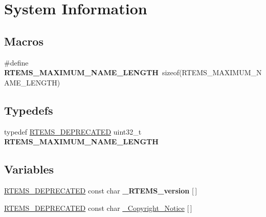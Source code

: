 \hypertarget{group__RTEMSScoreSystem}{}\section{System Information}
\label{group__RTEMSScoreSystem}
\subsection*{Macros}
\begin{DoxyCompactItemize}
\item 
\mbox{\label{group__RTEMSScoreSystem_ga4fbecf4ef5f02c9c17f7a0688cec14a9}} 
\#define {\bfseries R\+T\+E\+M\+S\+\_\+\+M\+A\+X\+I\+M\+U\+M\+\_\+\+N\+A\+M\+E\+\_\+\+L\+E\+N\+G\+TH}~sizeof(R\+T\+E\+M\+S\+\_\+\+M\+A\+X\+I\+M\+U\+M\+\_\+\+N\+A\+M\+E\+\_\+\+L\+E\+N\+G\+TH)
\end{DoxyCompactItemize}
\subsection*{Typedefs}
\begin{DoxyCompactItemize}
\item 
\mbox{\label{group__RTEMSScoreSystem_ga2ab4bed0e2e514060caaebdae35b8288}} 
typedef \mbox{\hyperlink{group__RTEMSScoreBaseDefs_gab651a076d4d51d50221e7ef7ac99d4e7}{R\+T\+E\+M\+S\+\_\+\+D\+E\+P\+R\+E\+C\+A\+T\+ED}} uint32\+\_\+t {\bfseries R\+T\+E\+M\+S\+\_\+\+M\+A\+X\+I\+M\+U\+M\+\_\+\+N\+A\+M\+E\+\_\+\+L\+E\+N\+G\+TH}
\end{DoxyCompactItemize}
\subsection*{Variables}
\begin{DoxyCompactItemize}
\item 
\mbox{\label{group__RTEMSScoreSystem_gaefe4671266ec7c97dcb0cd6924407fe0}} 
\mbox{\hyperlink{group__RTEMSScoreBaseDefs_gab651a076d4d51d50221e7ef7ac99d4e7}{R\+T\+E\+M\+S\+\_\+\+D\+E\+P\+R\+E\+C\+A\+T\+ED}} const char {\bfseries \+\_\+\+R\+T\+E\+M\+S\+\_\+version} \mbox{[}$\,$\mbox{]}
\item 
\mbox{\hyperlink{group__RTEMSScoreBaseDefs_gab651a076d4d51d50221e7ef7ac99d4e7}{R\+T\+E\+M\+S\+\_\+\+D\+E\+P\+R\+E\+C\+A\+T\+ED}} const char \mbox{\hyperlink{group__RTEMSScoreSystem_ga8c1d8c81c301e447ff5c3060cbbfb01c}{\+\_\+\+Copyright\+\_\+\+Notice}} \mbox{[}$\,$\mbox{]}
\end{DoxyCompactItemize}


